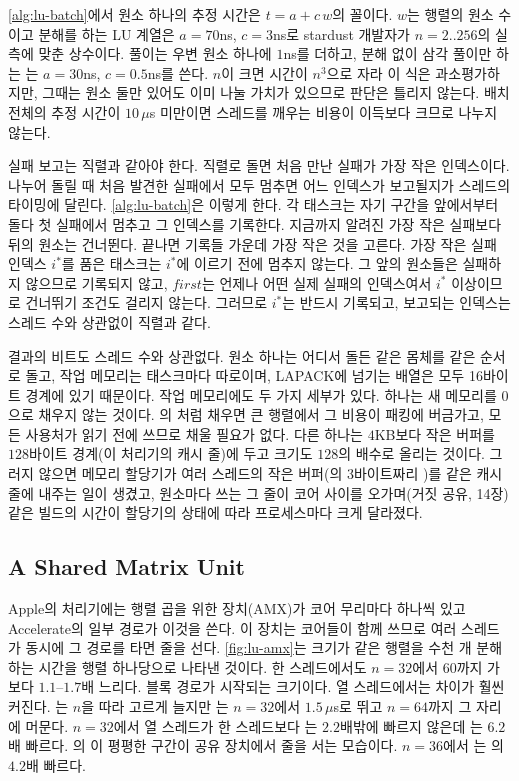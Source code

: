 \cref{alg:lu-batch}에서 원소 하나의 추정 시간은 $t=a+c\,w$의 꼴이다. $w$는 행렬의 원소 수이고 분해를 하는 LU 계열은 $a=70$ns, $c=3$ns로 stardust 개발자가 $n=2..256$의 실측에 맞춘 상수이다. 풀이는 우변 원소 하나에 $1$ns를 더하고, 분해 없이 삼각 풀이만 하는 는 $a=30$ns, $c=0.5$ns를 쓴다. $n$이 크면 시간이 $n^3$으로 자라 이 식은 과소평가하지만, 그때는 원소 둘만 있어도 이미 나눌 가치가 있으므로 판단은 틀리지 않는다. 배치 전체의 추정 시간이 $10\,\mu$s 미만이면 스레드를 깨우는 비용이 이득보다 크므로 나누지 않는다.

실패 보고는 직렬과 같아야 한다. 직렬로 돌면 처음 만난 실패가 가장 작은 인덱스이다. 나누어 돌릴 때 처음 발견한 실패에서 모두 멈추면 어느 인덱스가 보고될지가 스레드의 타이밍에 달린다. \cref{alg:lu-batch}은 이렇게 한다. 각 태스크는 자기 구간을 앞에서부터 돌다 첫 실패에서 멈추고 그 인덱스를 기록한다. 지금까지 알려진 가장 작은 실패보다 뒤의 원소는 건너뛴다. 끝나면 기록들 가운데 가장 작은 것을 고른다. 가장 작은 실패 인덱스 $i^\ast$를 품은 태스크는 $i^\ast$에 이르기 전에 멈추지 않는다. 그 앞의 원소들은 실패하지 않으므로 기록되지 않고, $\mathit{first}$는 언제나 어떤 실제 실패의 인덱스여서 $i^\ast$ 이상이므로 건너뛰기 조건도 걸리지 않는다. 그러므로 $i^\ast$는 반드시 기록되고, 보고되는 인덱스는 스레드 수와 상관없이 직렬과 같다.

결과의 비트도 스레드 수와 상관없다. 원소 하나는 어디서 돌든 같은 몸체를 같은 순서로 돌고, 작업 메모리는 태스크마다 따로이며, LAPACK에 넘기는 배열은 모두 16바이트 경계에 있기 때문이다. 작업 메모리에도 두 가지 세부가 있다. 하나는 새 메모리를 $0$으로 채우지 않는 것이다. 의 처럼 채우면 큰 행렬에서 그 비용이 패킹에 버금가고, 모든 사용처가 읽기 전에 쓰므로 채울 필요가 없다. 다른 하나는 $4$KB보다 작은 버퍼를 $128$바이트 경계(이 처리기의 캐시 줄)에 두고 크기도 $128$의 배수로 올리는 것이다. 그러지 않으면 메모리 할당기가 여러 스레드의 작은 버퍼(의 $3$바이트짜리 )를 같은 캐시 줄에 내주는 일이 생겼고, 원소마다 쓰는 그 줄이 코어 사이를 오가며(거짓 공유, 14장) 같은 빌드의 시간이 할당기의 상태에 따라 프로세스마다 크게 달라졌다.

\subsection{A Shared Matrix Unit}

Apple의 처리기에는 행렬 곱을 위한 장치(AMX)가 코어 무리마다 하나씩 있고 Accelerate의 일부 경로가 이것을 쓴다. 이 장치는 코어들이 함께 쓰므로 여러 스레드가 동시에 그 경로를 타면 줄을 선다. \cref{fig:lu-amx}는 크기가 같은 행렬을 수천 개 분해하는 시간을 행렬 하나당으로 나타낸 것이다. 한 스레드에서도 $n=32$에서 $60$까지 가 보다 $1.1$--$1.7$배 느리다. 블록 경로가 시작되는 크기이다. 열 스레드에서는 차이가 훨씬 커진다. 는 $n$을 따라 고르게 늘지만 는 $n=32$에서 $1.5\,\mu$s로 뛰고 $n=64$까지 그 자리에 머문다. $n=32$에서 열 스레드가 한 스레드보다 는 $2.2$배밖에 빠르지 않은데 는 $6.2$배 빠르다. 의 이 평평한 구간이 공유 장치에서 줄을 서는 모습이다. $n=36$에서 는 의 $4.2$배 빠르다.

